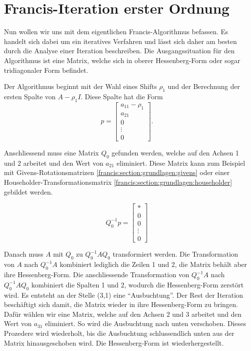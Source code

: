 \section{Francis-Iteration erster Ordnung\label{francis:section:francis_iteration}}

Nun wollen wir uns mit dem eigentlichen Francis-Algorithmus \cite{francis:watkins_book} befassen.
Es handelt sich dabei um ein iteratives Verfahren und lässt sich daher am besten durch die Analyse einer Iteration beschreiben.
Die Ausgangssituation für den Algorithmus ist eine Matrix, welche sich in oberer Hessenberg-Form oder sogar tridiagonaler Form befindet.

Der Algorithmus beginnt mit der Wahl eines Shifts $\rho_{1}$ und der Berechnung der ersten Spalte von $A-\rho_{1} I$. 
%
Diese Spalte hat die Form
\begin{equation}
	p=\begin{bmatrix}
	a_{11}-\rho_{1}\\
	a_{21}\\
	0\\
	\vdots\\
	0
	\end{bmatrix}.
\end{equation}

Anschliessend muss eine Matrix $Q_{0}$ gefunden werden, welche auf den Achsen 1 und 2 arbeitet und den Wert von $a_{21}$ eliminiert. Diese Matrix kann zum Beispiel mit Givens-Rotationsmatrizen \ref{francis:section:grundlagen:givens} oder einer Householder-Transformationsmatrix \ref{francis:section:grundlagen:householder} gebildet werden.

\begin{equation}
	Q_{0}^{-1}p=\begin{bmatrix}
	*\\
	0\\
	0\\
	\vdots\\
	0
	\end{bmatrix}
\end{equation}

Danach muss $A$ mit $Q_{0}$ zu  $Q_{0}^{-1}AQ_{0}$ transformiert werden.
Die Transformation von $A$ nach $Q_{0}^{-1}A$ kombiniert lediglich die Zeilen 1 und 2, die Matrix behält aber ihre Hessenberg-Form.
Die anschliessende Transformation von $Q_{0}^{-1}A$ nach $Q_{0}^{-1}AQ_{0}$ kombiniert die Spalten 1 und 2, wodurch die Hessenberg-Form zerstört wird.
Es entsteht an der Stelle (3,1) eine ``Ausbuchtung''.
%
Der Rest der Iteration beschäftigt sich damit, die Matrix wieder in ihre Hessenberg-Form zu bringen.
Dafür wählen wir eine Matrix, welche auf den Achsen 2 und 3 arbeitet und den Wert von $a_{31}$ eliminiert.
So wird die Ausbuchtung nach unten verschoben.
Dieses Prozedere wird wiederholt, bis die Ausbuchtung schlussendlich unten aus der Matrix hinausgeschoben wird.
Die Hessenberg-Form ist wiederhergestellt.

